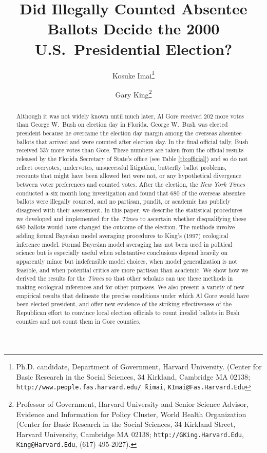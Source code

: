 \documentclass[11pt,titlepage]{article}
\title{Did Illegally Counted Absentee Ballots Decide the 2000 U.S.\ 
  Presidential Election?}
\author{Kosuke Imai\thanks{Ph.D. candidate, Department of Government,
    Harvard University. (Center for Basic Research in the Social
    Sciences, 34 Kirkland, Cambridge MA 02138;
    \texttt{http://www.people.fas.harvard.edu/\~\,kimai},
    \texttt{KImai@Fas.Harvard.Edu}}
\and %
Gary King\thanks{Professor of Government, Harvard University and
  Senior Science Advisor, Evidence and Information for Policy Cluster,
  World Health Organization (Center for Basic Research in the Social
  Sciences, 34 Kirkland Street, Harvard University, Cambridge MA
  02138; \texttt{http://GKing.Harvard.Edu}, \texttt{King@Harvard.Edu},
  (617) 495-2027).}  }
\begin{document}
\maketitle

\begin{abstract}
  Although it was not widely known until much later, Al Gore received
  202 more votes than George W.\ Bush on election day in Florida.
  George W.\ Bush was elected president because he overcame the
  election day margin among the overseas absentee ballots that arrived
  and were counted after election day.  In the final official tally,
  Bush received 537 more votes than Gore.  These numbers are taken
  from the official results released by the Florida Secretary of
  State's office (see Table \ref{tb:official}) and so do not reflect
  overvotes, undervotes, unsuccessful litigation, butterfly ballot
  problems, recounts that might have been allowed but were not, or any
  hypothetical divergence between voter preferences and counted votes.
  After the election, the \emph{New York Times} conducted a six month
  long investigation and found that 680 of the overseas absentee
  ballots were illegally counted, and no partisan, pundit, or academic
  has publicly disagreed with their assessment.  In this paper, we
  describe the statistical procedures we developed and implemented for
  the \emph{Times} to ascertain whether disqualifying these 680
  ballots would have changed the outcome of the election.  The methods
  involve adding formal Bayesian model averaging procedures to King's
  (1997) ecological inference model.  Formal Bayesian model averaging
  has not been used in political science but is especially useful when
  substantive conclusions depend heavily on apparently minor but
  indefensible model choices, when model generalization is not
  feasible, and when potential critics are more partisan than
  academic.  We show how we derived the results for the \emph{Times}
  so that other scholars can use these methods in making ecological
  inferences and for other purposes.  We also present a variety of new
  empirical results that delineate the precise conditions under which
  Al Gore would have been elected president, and offer new evidence of
  the striking effectiveness of the Republican effort to convince
  local election officials to count invalid ballots in Bush counties
  and not count them in Gore counties.
\end{abstract}

\end{document}
